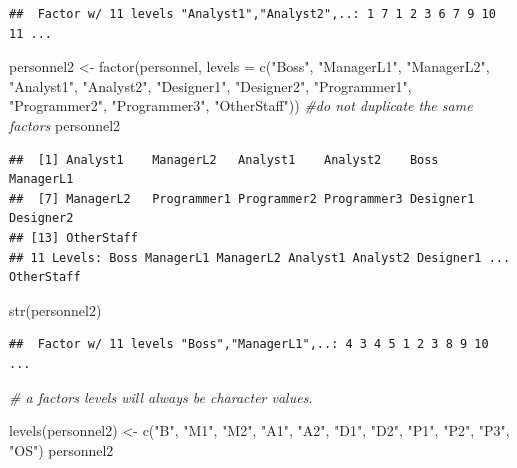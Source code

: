 \documentclass[
]{book}
\newenvironment{Shaded}{\begin{snugshade}}{\end{snugshade}}
\newcommand{\AttributeTok}[1]{\textcolor[rgb]{0.77,0.63,0.00}{#1}}
\newcommand{\CommentTok}[1]{\textcolor[rgb]{0.56,0.35,0.01}{\textit{#1}}}
\newcommand{\FunctionTok}[1]{\textcolor[rgb]{0.00,0.00,0.00}{#1}}
\newcommand{\NormalTok}[1]{#1}
\newcommand{\OtherTok}[1]{\textcolor[rgb]{0.56,0.35,0.01}{#1}}
\newcommand{\StringTok}[1]{\textcolor[rgb]{0.31,0.60,0.02}{#1}}
\begin{document}
\begin{verbatim}
##  Factor w/ 11 levels "Analyst1","Analyst2",..: 1 7 1 2 3 6 7 9 10 11 ...
\end{verbatim}

\begin{Shaded}
\begin{Highlighting}[]
\NormalTok{personnel2 }\OtherTok{\textless{}{-}} \FunctionTok{factor}\NormalTok{(personnel, }
                     \AttributeTok{levels =} \FunctionTok{c}\NormalTok{(}\StringTok{"Boss"}\NormalTok{, }\StringTok{"ManagerL1"}\NormalTok{, }\StringTok{"ManagerL2"}\NormalTok{, }
                                \StringTok{"Analyst1"}\NormalTok{, }\StringTok{"Analyst2"}\NormalTok{,  }\StringTok{"Designer1"}\NormalTok{,}
                                \StringTok{"Designer2"}\NormalTok{, }\StringTok{"Programmer1"}\NormalTok{, }\StringTok{"Programmer2"}\NormalTok{, }
                                \StringTok{"Programmer3"}\NormalTok{, }\StringTok{"OtherStaff"}\NormalTok{)) }
                                \CommentTok{\#do not duplicate the same factors}
\NormalTok{personnel2}
\end{Highlighting}
\end{Shaded}

\begin{verbatim}
##  [1] Analyst1    ManagerL2   Analyst1    Analyst2    Boss        ManagerL1  
##  [7] ManagerL2   Programmer1 Programmer2 Programmer3 Designer1   Designer2  
## [13] OtherStaff 
## 11 Levels: Boss ManagerL1 ManagerL2 Analyst1 Analyst2 Designer1 ... OtherStaff
\end{verbatim}

\begin{Shaded}
\begin{Highlighting}[]
\FunctionTok{str}\NormalTok{(personnel2)}
\end{Highlighting}
\end{Shaded}

\begin{verbatim}
##  Factor w/ 11 levels "Boss","ManagerL1",..: 4 3 4 5 1 2 3 8 9 10 ...
\end{verbatim}

\begin{Shaded}
\begin{Highlighting}[]
\CommentTok{\# a factor\textquotesingle{}s levels will always be character values.}

\FunctionTok{levels}\NormalTok{(personnel2) }\OtherTok{\textless{}{-}} \FunctionTok{c}\NormalTok{(}\StringTok{"B"}\NormalTok{, }\StringTok{"M1"}\NormalTok{, }\StringTok{"M2"}\NormalTok{, }\StringTok{"A1"}\NormalTok{, }\StringTok{"A2"}\NormalTok{,}
                        \StringTok{"D1"}\NormalTok{, }\StringTok{"D2"}\NormalTok{, }\StringTok{"P1"}\NormalTok{, }\StringTok{"P2"}\NormalTok{, }\StringTok{"P3"}\NormalTok{, }\StringTok{"OS"}\NormalTok{)}
\NormalTok{personnel2}
\end{Highlighting}
\end{Shaded}
\end{document}
